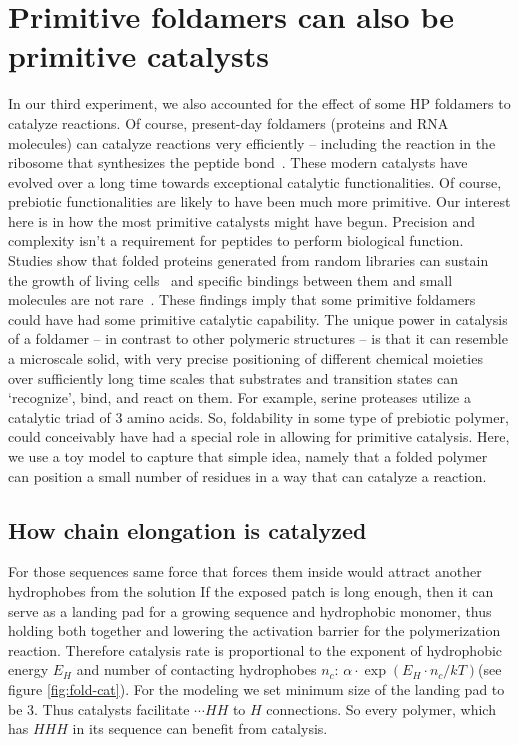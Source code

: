 \documentclass[journal=jacsat,manuscript=article,layout=twocolumn]{achemso}
\newcommand*{\ga}{\alpha}
\begin{document}
\section{Primitive foldamers can also be primitive catalysts}

 In our third experiment, we also accounted for the effect of some HP foldamers to catalyze 
reactions.  
Of course, present-day foldamers (proteins and RNA molecules) can catalyze reactions very 
efficiently -- including the reaction in the ribosome that synthesizes the peptide 
bond~\cite{Stachelhaus1998}. These modern catalysts have evolved over a long time towards 
exceptional catalytic functionalities.  Of course, prebiotic functionalities are likely to have 
been 
much more primitive.  Our interest here is in how the most primitive catalysts might have begun.  
Precision and complexity isn't a requirement for peptides to perform biological function. Studies 
show that folded proteins generated from random libraries can sustain the growth of living 
cells~\cite{Fisher2011} and specific bindings between them and small molecules are not 
rare~\cite{Cherny2012}. These findings imply that some primitive foldamers could have had some 
primitive catalytic capability.  The unique power in catalysis of a foldamer -- in contrast to 
other 
polymeric structures -- is that it can resemble a microscale solid, with very precise positioning 
of 
different chemical moieties over sufficiently long time scales that substrates and transition 
states 
can `recognize', bind, and react on them.  For example, serine proteases utilize a catalytic triad 
of 3 amino acids.  So, foldability in some type of prebiotic polymer, could conceivably have had a 
special role in allowing for primitive catalysis.  Here, we use a toy model to capture that simple 
idea, namely that a folded polymer can position a small number of residues in a way that can 
catalyze a reaction.  


\subsection{How chain elongation is catalyzed}

For those sequences same force that forces them inside would attract another hydrophobes 
from the solution
If the exposed patch is long enough, then it can serve as a landing pad for a growing sequence and 
hydrophobic monomer, thus holding both together and lowering the activation barrier for the 
polymerization reaction. Therefore catalysis rate is proportional to the exponent of hydrophobic 
energy $E_H$ and number of contacting 
hydrophobes $n_c$: $\ga\cdot\exp(E_{H}\cdot n_{c}/kT)$(see figure \ref{fig:fold-cat}).  
For the modeling we set minimum size of the landing pad to be 3. Thus catalysts facilitate $\cdots 
HH$ to 
$H$ connections. So every polymer, which has $HHH$ in its sequence can benefit from catalysis. 
\end{document}
